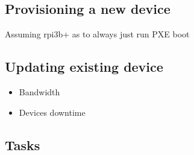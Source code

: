 \documentclass[../../main.tex]{subfiles}
\begin{document}
\subsection{Provisioning a new device}%
\label{sub:provisioning_a_new_device}
Assuming rpi3b+ as to always just run PXE boot

\subsection{Updating existing device}%
\label{sub:updating_existing_device}

\begin{itemize}
	\item Bandwidth
	\item Devices downtime
\end{itemize}

\subsection{Tasks}%
\label{sub:tasks}




	
\end{document}
